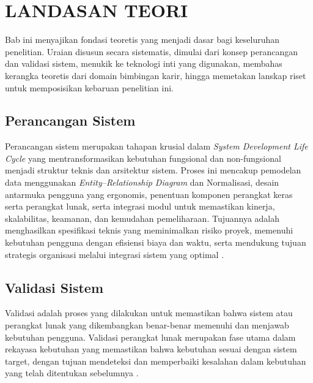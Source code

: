 \chapter{LANDASAN TEORI}

Bab ini menyajikan fondasi teoretis yang menjadi dasar bagi keseluruhan penelitian.
Uraian disusun secara sistematis, dimulai dari konsep perancangan dan validasi sistem,
menukik ke teknologi inti yang digunakan, membahas kerangka teoretis dari domain
bimbingan karir, hingga memetakan lanskap riset untuk memposisikan kebaruan penelitian ini.

\section{Perancangan Sistem}
Perancangan sistem merupakan tahapan krusial dalam \textit{System Development Life Cycle}
yang mentransformasikan kebutuhan fungsional dan non-fungsional menjadi struktur teknis
dan arsitektur sistem. Proses ini mencakup pemodelan data menggunakan
\textit{Entity--Relationship Diagram} dan Normalisasi, desain antarmuka pengguna yang
ergonomis, penentuan komponen perangkat keras serta perangkat lunak, serta integrasi modul
untuk memastikan kinerja, skalabilitas, keamanan, dan kemudahan pemeliharaan.
Tujuannya adalah menghasilkan spesifikasi teknis yang meminimalkan risiko proyek,
memenuhi kebutuhan pengguna dengan efisiensi biaya dan waktu, serta mendukung tujuan
strategis organisasi melalui integrasi sistem yang optimal \cite{Varezki2021}.

\section{Validasi Sistem}
Validasi adalah proses yang dilakukan untuk memastikan bahwa sistem atau perangkat lunak
yang dikembangkan benar-benar memenuhi dan menjawab kebutuhan pengguna.
Validasi perangkat lunak merupakan fase utama dalam rekayasa kebutuhan yang memastikan
bahwa kebutuhan sesuai dengan sistem target, dengan tujuan mendeteksi dan memperbaiki
kesalahan dalam kebutuhan yang telah ditentukan sebelumnya \cite{Atoum2021}.

